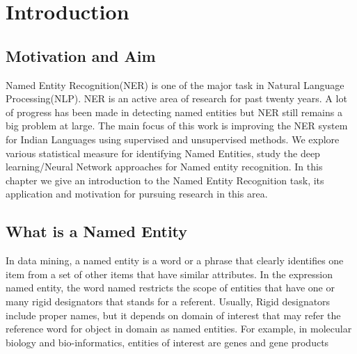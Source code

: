 \documentclass[12pt,a4paper]{article}
\begin{document}
\section{Introduction}


\subsection{Motivation and Aim}

Named Entity Recognition(NER) is one of the major task in Natural Language Processing(NLP). NER
is an active area of research for past twenty years. A lot of progress has been made in detecting named
entities but NER still remains a big problem at large.
The main focus of this work is improving the NER system for Indian Languages using supervised
and unsupervised methods. We explore various statistical measure for identifying Named Entities, study
the deep learning/Neural Network approaches for Named entity recognition. In this chapter we give an
introduction to the Named Entity Recognition task, its application and motivation for pursuing research
in this area.
\subsection{What is a Named Entity}
In data mining, a named entity is a word or a phrase that clearly identifies one item from a set of other
items that have similar attributes. In the expression named entity, the word named restricts the scope
of entities that have one or many rigid designators that stands for a referent. Usually, Rigid designators
include proper names, but it depends on domain of interest that may refer the reference word for object
in domain as named entities. For example, in molecular biology and bio-informatics, entities of interest
are genes and gene products
\end{document}
